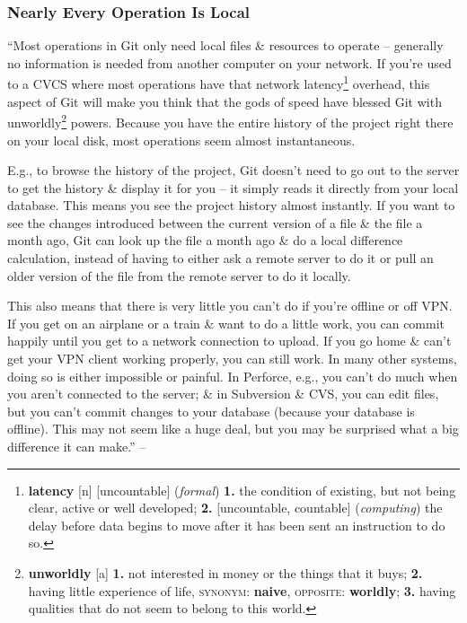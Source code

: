 \documentclass[oneside]{book}
\numberwithin{equation}{section}
\begin{document}
\subsubsection{Nearly Every Operation Is Local}
``Most operations in Git only need local files \& resources to operate -- generally no information is needed from another computer on your network. If you're used to a CVCS where most operations have that network latency\footnote{\textbf{latency} [n] [uncountable] (\textit{formal}) \textbf{1.} the condition of existing, but not being clear, active or well developed; \textbf{2.} [uncountable, countable] (\textit{computing}) the delay before data begins to move after it has been sent an instruction to do so.} overhead, this aspect of Git will make you think that the gods of speed have blessed Git with unworldly\footnote{\textbf{unworldly} [a] \textbf{1.} not interested in money or the things that it buys; \textbf{2.} having little experience of life, \textsc{synonym}: \textbf{naive}, \textsc{opposite}: \textbf{worldly}; \textbf{3.} having qualities that do not seem to belong to this world.} powers. Because you have the entire history of the project right there on your local disk, most operations seem almost instantaneous.

E.g., to browse the history of the project, Git doesn't need to go out to the server to get the history \& display it for you -- it simply reads it directly from your local database. This means you see the project history almost instantly. If you want to see the changes introduced between the current version of a file \& the file a month ago, Git can look up the file a month ago \& do a local difference calculation, instead of having to either ask a remote server to do it or pull an older version of the file from the remote server to do it locally.

This also means that there is very little you can't do if you're offline or off VPN. If you get on an airplane or a train \& want to do a little work, you can commit happily until you get to a network connection to upload. If you go home \& can't get your VPN client working properly, you can still work. In many other systems, doing so is either impossible or painful. In Perforce, e.g., you can't do much when you aren't connected to the server; \& in Subversion \& CVS, you can edit files, but you can't commit changes to your database (because your database is offline). This may not seem like a huge deal, but you may be surprised what a big difference it can make.'' -- \cite[p. 7]{Chacon_Straub2014}
\end{document}
